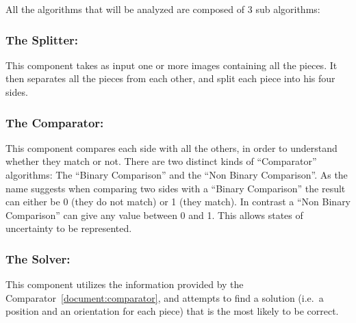\documentclass{article}
\newenvironment{indented_section}
  {\adjustwidth{3em}{0pt}}
  {\endadjustwidth}
\begin{document}
All the algorithms that will be analyzed are composed of 3 sub algorithms:

\begin{indented_section}

    \subsubsection{The Splitter:} This component takes as input one or more images
    containing all the pieces. It then separates all the pieces from each other,
    and split each piece into his four sides.\label{document:splitter}

    \subsubsection{The Comparator:} This component compares each side with all the
    others, in order to understand whether they match or not.\newline
    There are two distinct kinds of “Comparator” algorithms:
    The “Binary Comparison” and the “Non Binary Comparison”.
    As the name suggests when comparing two sides with a “Binary Comparison”
    the result can either be 0 (they do not match) or 1 (they match).
    In contrast a “Non Binary Comparison” can give any value between 0 and 1.
    This allows states of uncertainty to be represented.\label{document:comparator}

    \subsubsection{The Solver:} This component utilizes the information provided by the
    Comparator~\ref{document:comparator}, and attempts to find a solution
    (i.e.\ a position and an orientation for each piece)
    that is the most likely to be correct.\label{document:solver}

\end{indented_section}
\end{document}
